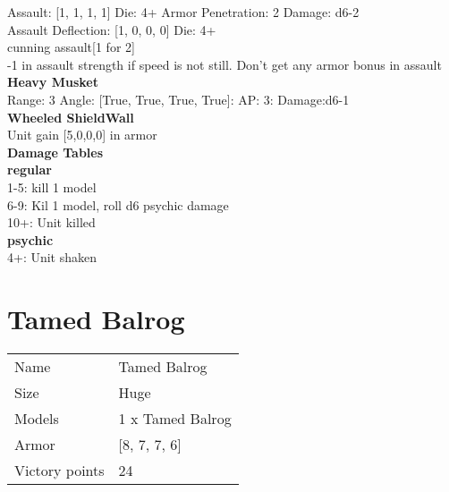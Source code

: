 Assault: [1, 1, 1, 1] Die: 4+ Armor Penetration: 2 Damage: d6-2 \\
Assault Deflection: [1, 0, 0, 0] Die: 4+\\
\indent cunning assault[1 for 2]\\ 
-1 in assault strength if speed is not still. Don't get any armor bonus in assault\\ 



{\bf Heavy Musket } \\



Range: 3  Angle: [True, True, True, True]: AP: 3: Damage:d6-1 \\




{\bf Wheeled ShieldWall } \\

Unit gain [5,0,0,0] in armor\\ 





 





{\bf Damage Tables} \\
 {\bf regular } \\
1-5: kill 1 model \\
6-9: Kil 1 model, roll d6 psychic damage \\
10+: Unit killed \\
 {\bf psychic } \\
4+: Unit shaken \\










\pagebreak\pagebreak

\section{ Tamed Balrog }

\begin{tabular}{ll}
  Name & Tamed Balrog \\
  Size & Huge\\
  Models & 1 x Tamed Balrog\\
  Armor & [8, 7, 7, 6]\\
  Victory points & 24\\
\end{tabular}

